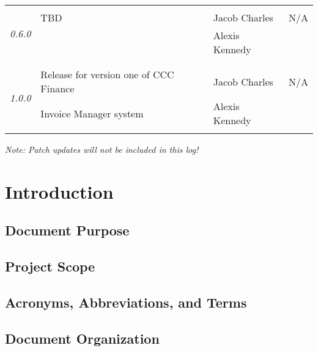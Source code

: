 \documentclass[]{article}
\begin{document}
\begin{table}
\begin{tabular}{|l|l|l|l|}
			\multirow{4}{*}{\emph{0.6.0}} 
				
			& & & \\
			& TBD & Jacob Charles & N/A \\
			& & Alexis Kennedy & \\
			& & & \\
			\hline
				
			\multirow{4}{*}{\emph{1.0.0}} 

			& & & \\
			& Release for version one of CCC Finance & Jacob Charles & N/A \\
			& Invoice Manager system & Alexis Kennedy & \\
			& & & \\
			\hline
				
		\end{tabular}
	\end{table}
	\textit{Note: Patch updates will not be included in this log!}
	\vfill	
	

	\newpage
	\tableofcontents
	\newpage
	
	
	\section{Introduction}
	
	
	\subsection{Document Purpose}
	
	
	\subsection{Project Scope}
	
	
	\subsection{Acronyms, Abbreviations, and Terms}

	
	\subsection{Document Organization}
	
\end{document}
